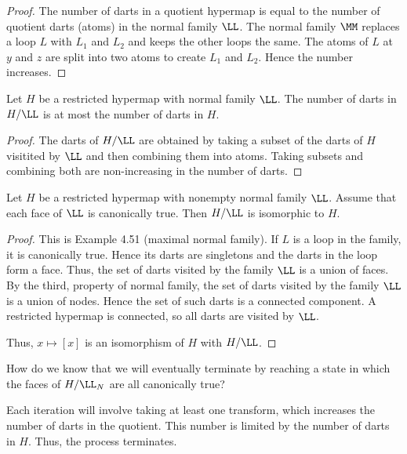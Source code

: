 \begin{proof}  The number of darts in a quotient hypermap is equal
to the number of quotient darts (atoms) in the normal family $\LL$.
The normal family $\MM$ replaces a loop $L$ with $L_1$ and $L_2$
and keeps the other loops the same.  The atoms of $L$ at
$y$ and $z$ are split into two atoms to create $L_1$ and $L_2$.
Hence the number increases.
\end{proof}

\begin{lemma}
 Let $H$ be a restricted hypermap with normal family
$\LL$.  The number of darts in $H/\LL$ is at most the number of
darts in $H$.  
\end{lemma} 

\begin{proof} The darts of $H/\LL$ are obtained by taking a subset
of the darts of $H$ visitited by $\LL$ and then combining them into
atoms.  Taking subsets and combining both are non-increasing
in the number of darts.  
\end{proof}

\begin{lemma}
Let $H$ be a restricted hypermap with nonempty
normal family
$\LL$.  Assume that each face of $\LL$ is canonically true.  Then
$H/\LL$ is isomorphic to $H$.
\end{lemma} 

\begin{proof} This is Example 4.51 (maximal normal family).
If $L$ is a loop in the family, it is canonically true.  Hence its
darts are singletons and the darts in the loop form a face.  Thus,
the set of darts visited by the family $\LL$ is a union of faces.
By the third, property of normal family, the set of darts visited by
the family $\LL$ is a union of nodes.  Hence the set of such darts is
a connected component.  A restricted hypermap is connected,
so all darts are visited by $\LL$.  

Thus, $x \mapsto [x]$ is an isomorphism of $H$ with $H/\LL$.
\end{proof}


How do we know that we will eventually terminate by reaching
a state in which the faces of $H/\LL_N$ are all canonically true?

Each iteration will involve taking at least one transform, which
increases the number of darts in the quotient.  This number is
limited by the number of darts in $H$.  Thus, the process terminates.

